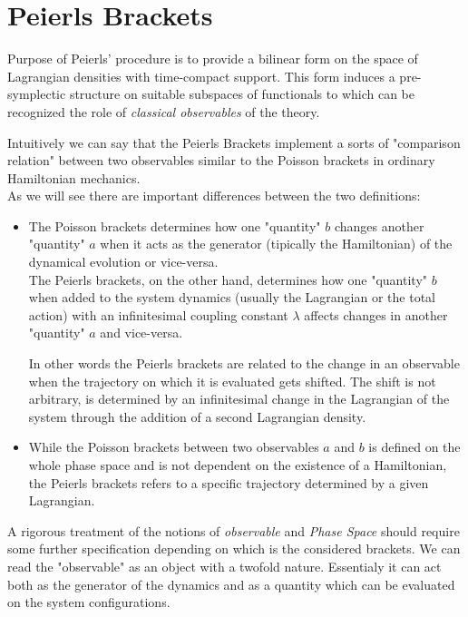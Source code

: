\documentclass[Main]{subfiles}
\begin{document}
	\section{Peierls Brackets}\label{Section:PeierlsBrackets}
		Purpose of Peierls' procedure is to provide a bilinear form on the space of Lagrangian densities with time-compact support.
		This form induces a pre-symplectic structure on suitable subspaces of functionals to which can be recognized the role of \emph{classical observables}  of the theory.	

	\vspace{2mm}	
		Intuitively we can say that the Peierls Brackets implement a sorts of "comparison relation" between two observables similar to the Poisson brackets in ordinary Hamiltonian mechanics.\\
		As we will see there are important differences between the two definitions:
		\begin{itemize}
			\item The Poisson brackets determines how one "quantity" $b$ changes another "quantity" $a$ when it acts as the  generator (tipically the  Hamiltonian) of the dynamical evolution or vice-versa. \cite{Sharan2010}
	\\	
	The Peierls brackets, on the other hand, determines how one "quantity" $b$  when added to the system dynamics (usually the Lagrangian or the total action)  with an infinitesimal coupling constant $\lambda$ affects changes in another "quantity" $a$ and vice-versa.
	
	In other words the Peierls brackets are related to the change in an observable when the trajectory on which it is evaluated gets shifted.
	The shift is not arbitrary, is determined by an infinitesimal change in the Lagrangian of the system through the addition of a second Lagrangian density.
	
			\item While the Poisson brackets between two observables $a$ and $b$ is defined on the whole phase space and is not dependent on the existence of a Hamiltonian, the Peierls brackets refers to a specific trajectory determined by a given Lagrangian. 
		\end{itemize}
		A rigorous treatment of the notions of \emph{observable} and \emph{Phase Space} should require some further specification depending on which is the  considered brackets.		
		We can read the "observable" as an object with a twofold nature. Essentialy it can act both as the generator of the dynamics and as a quantity which can be evaluated on the system configurations.
\end{document}
